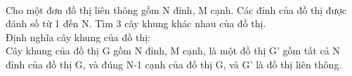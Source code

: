  

Cho một đơn đồ thị liên thông gồm N đỉnh, M cạnh. Các đỉnh của đồ thị được đánh số từ 1 đến N. Tìm 3 cây khung khác nhau của đồ thị.
\\Định nghĩa cây khung của đồ thị:
\\Cây khung của đồ thị G gồm N đỉnh, M cạnh, là một đồ thị G’ gồm tất cả N đỉnh của đồ thị G, và đúng N-1 cạnh của đồ thị G, và G’ là đồ thị liên thông.